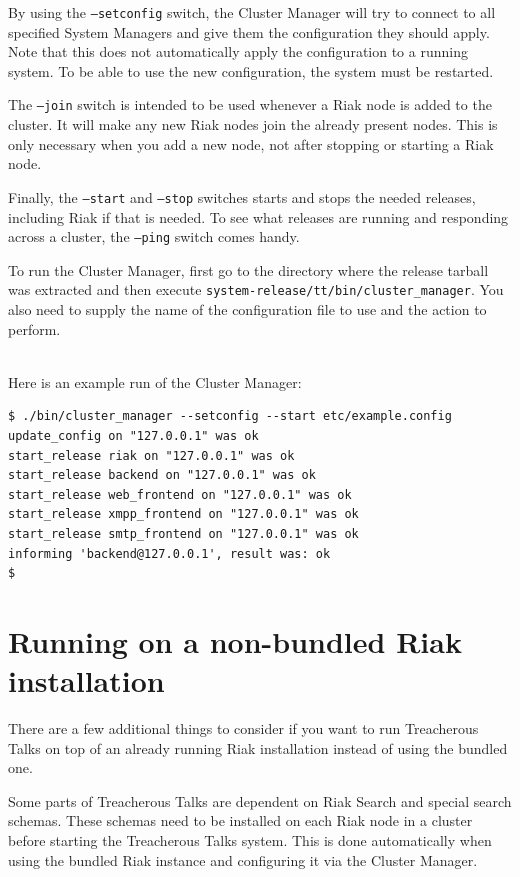 \documentclass[11pt,a4paper]{report}
\begin{document}
By using the {\tt --setconfig} switch, the Cluster Manager will try to connect
to all specified System Managers and give them the configuration they should
apply. Note that this does not automatically apply the configuration to a
running system. To be able to use the new configuration, the system must be
restarted.

The {\tt --join} switch is intended to be used whenever a Riak node is added to
the cluster. It will make any new Riak nodes join the already present
nodes. This is only necessary when you add a new node, not after stopping or
starting a Riak node.

Finally, the {\tt --start} and {\tt --stop} switches starts and stops the needed
releases, including Riak if that is needed. To see what releases are running and
responding across a cluster, the {\tt--ping} switch comes handy.

\begin{sloppypar}
To run the Cluster Manager, first go to the directory where the release tarball
was extracted and then execute {\tt system-release/tt/bin/cluster\_manager}. You
also need to supply the name of the configuration file to use and the action to
perform.
\end{sloppypar}
\mbox{}\\
Here is an example run of the Cluster Manager:
\begin{verbatim}
$ ./bin/cluster_manager --setconfig --start etc/example.config
update_config on "127.0.0.1" was ok
start_release riak on "127.0.0.1" was ok
start_release backend on "127.0.0.1" was ok
start_release web_frontend on "127.0.0.1" was ok
start_release xmpp_frontend on "127.0.0.1" was ok
start_release smtp_frontend on "127.0.0.1" was ok
informing 'backend@127.0.0.1', result was: ok
$
\end{verbatim}
\section{Running on a non-bundled Riak installation}
There are a few additional things to consider if you want to run Treacherous
Talks on top of an already running Riak installation instead of using the
bundled one.

Some parts of Treacherous Talks are dependent on Riak Search and special search
schemas. These schemas need to be installed on each Riak node in a cluster
before starting the Treacherous Talks system. This is done automatically when
using the bundled Riak instance and configuring it via the Cluster Manager.
\end{document}
